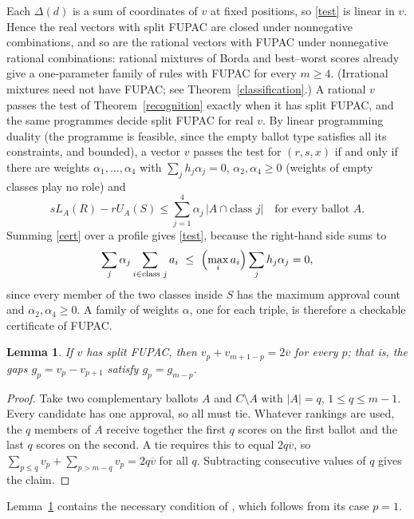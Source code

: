 \documentclass[11pt,a4paper]{article}
\newtheorem{lemma}[theorem]{Lemma}
\theoremstyle{definition}
\theoremstyle{remark}
\begin{document}
Each $\Delta(d)$ is a sum of coordinates of $v$ at fixed positions, so \eqref{test} is linear in $v$. Hence the real vectors with split FUPAC are closed under nonnegative combinations, and so are the rational vectors with FUPAC under nonnegative rational combinations: rational mixtures of Borda and best--worst scores already give a one-parameter family of rules with FUPAC for every $m\ge4$. (Irrational mixtures need not have FUPAC; see Theorem~\ref{classification}.) A rational $v$ passes the test of Theorem~\ref{recognition} exactly when it has split FUPAC, and the same programmes decide split FUPAC for real $v$. By linear programming duality (the programme is feasible, since the empty ballot type satisfies all its constraints, and bounded), a vector $v$ passes the test for $(r,s,x)$ if and only if there are weights $\alpha_1,\ldots,\alpha_4$ with $\sum_jh_j\alpha_j=0$, $\alpha_2,\alpha_4\ge0$ (weights of empty classes play no role) and
\begin{equation}
  sL_A(R)-rU_A(S)\le\sum_{j=1}^4\alpha_j\,|A\cap\text{class }j|
  \quad\text{for every ballot }A.\label{cert}
\end{equation}
Summing \eqref{cert} over a profile gives \eqref{test}, because the right-hand side sums to
\[
 \sum_j\alpha_j\sum_{i\in\text{class }j}a_i\ \le\ \Bigl(\max_ia_i\Bigr)\sum_jh_j\alpha_j=0,
\]
since every member of the two classes inside $S$ has the maximum approval count and $\alpha_2,\alpha_4\ge0$. A family of weights $\alpha$, one for each triple, is therefore a checkable certificate of FUPAC.

\begin{lemma}\label{symmetry}
If $v$ has split FUPAC, then $v_p+v_{m+1-p}=2\overline v$ for every $p$; that is, the gaps $g_p=v_p-v_{p+1}$ satisfy $g_p=g_{m-p}$.
\end{lemma}
\begin{proof}
Take two complementary ballots $A$ and $C\setminus A$ with $|A|=q$, $1\le q\le m-1$. Every candidate has one approval, so all must tie. Whatever rankings are used, the $q$ members of $A$ receive together the first $q$ scores on the first ballot and the last $q$ scores on the second. A tie requires this to equal $2q\overline v$, so $\sum_{p\le q}v_p+\sum_{p>m-q}v_p=2q\overline v$ for all $q$. Subtracting consecutive values of $q$ gives the claim.
\end{proof}

Lemma~\ref{symmetry} contains the necessary condition of \cite[Lemma~3]{tlz}, which follows from its case $p=1$.
\end{document}
